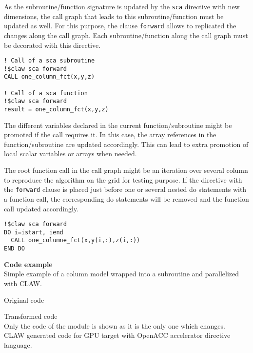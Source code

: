 As the subroutine/function signature is updated by the \lstinline!sca!
directive with new dimensions, the call graph that leads to this
subroutine/function must be updated as well. For this purpose, the clause
\lstinline!forward! allows to replicated the changes along the call graph.
Each subroutine/function along the call graph must be decorated with this
directive.

\begin{lstlisting}
! Call of a sca subroutine
!$claw sca forward
CALL one_column_fct(x,y,z)

! Call of a sca function
!$claw sca forward
result = one_column_fct(x,y,z)
\end{lstlisting}

The different variables declared in the current function/subroutine might be
promoted if the call requires it. In this case, the array references in
the function/subroutine are updated accordingly. This can lead to extra
promotion of local scalar variables or arrays when needed.

The root function call in the call graph might be an iteration over several
column to reproduce the algorithm on the grid for testing purpose. If the
directive with the \lstinline!forward! clause is placed just before one or
several nested do statements with a function call, the corresponding do
statements will be removed and the function call updated accordingly.

\begin{lstlisting}
!$claw sca forward
DO i=istart, iend
  CALL one_columne_fct(x,y(i,:),z(i,:))
END DO
\end{lstlisting}

\textbf{Code example}\\
\label{parallelize1}
Simple example of a column model wrapped into a subroutine and parallelized with
CLAW.

Original code



Transformed code\\
Only the code of the module is shown as it is the only one which changes.\\

CLAW generated code for GPU target with OpenACC accelerator directive language.


